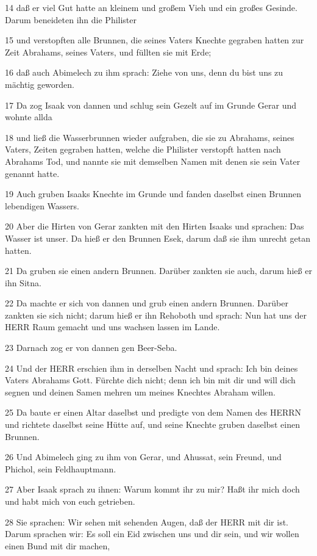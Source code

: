 \par 14 daß er viel Gut hatte an kleinem und großem Vieh und ein großes Gesinde. Darum beneideten ihn die Philister
\par 15 und verstopften alle Brunnen, die seines Vaters Knechte gegraben hatten zur Zeit Abrahams, seines Vaters, und füllten sie mit Erde;
\par 16 daß auch Abimelech zu ihm sprach: Ziehe von uns, denn du bist uns zu mächtig geworden.
\par 17 Da zog Isaak von dannen und schlug sein Gezelt auf im Grunde Gerar und wohnte allda
\par 18 und ließ die Wasserbrunnen wieder aufgraben, die sie zu Abrahams, seines Vaters, Zeiten gegraben hatten, welche die Philister verstopft hatten nach Abrahams Tod, und nannte sie mit demselben Namen mit denen sie sein Vater genannt hatte.
\par 19 Auch gruben Isaaks Knechte im Grunde und fanden daselbst einen Brunnen lebendigen Wassers.
\par 20 Aber die Hirten von Gerar zankten mit den Hirten Isaaks und sprachen: Das Wasser ist unser. Da hieß er den Brunnen Esek, darum daß sie ihm unrecht getan hatten.
\par 21 Da gruben sie einen andern Brunnen. Darüber zankten sie auch, darum hieß er ihn Sitna.
\par 22 Da machte er sich von dannen und grub einen andern Brunnen. Darüber zankten sie sich nicht; darum hieß er ihn Rehoboth und sprach: Nun hat uns der HERR Raum gemacht und uns wachsen lassen im Lande.
\par 23 Darnach zog er von dannen gen Beer-Seba.
\par 24 Und der HERR erschien ihm in derselben Nacht und sprach: Ich bin deines Vaters Abrahams Gott. Fürchte dich nicht; denn ich bin mit dir und will dich segnen und deinen Samen mehren um meines Knechtes Abraham willen.
\par 25 Da baute er einen Altar daselbst und predigte von dem Namen des HERRN und richtete daselbst seine Hütte auf, und seine Knechte gruben daselbst einen Brunnen.
\par 26 Und Abimelech ging zu ihm von Gerar, und Ahussat, sein Freund, und Phichol, sein Feldhauptmann.
\par 27 Aber Isaak sprach zu ihnen: Warum kommt ihr zu mir? Haßt ihr mich doch und habt mich von euch getrieben.
\par 28 Sie sprachen: Wir sehen mit sehenden Augen, daß der HERR mit dir ist. Darum sprachen wir: Es soll ein Eid zwischen uns und dir sein, und wir wollen einen Bund mit dir machen,
